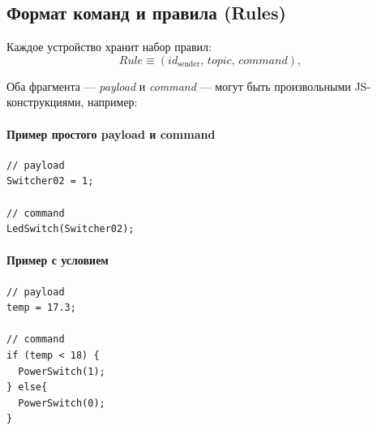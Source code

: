 \documentclass[14pt, a4paper]{extreport}
\begin{document}
\subsection{Формат команд и правила (Rules)}
Каждое устройство хранит набор правил:
\[
\textit{Rule} \equiv (\mathit{id}_{\mathrm{sender}},\,\textit{topic},\,\textit{command}),
\]

Оба фрагмента — \textit{payload} и \textit{command} — могут быть произвольными JS-конструкциями, например:

\paragraph{Пример простого payload и command}
\begin{verbatim}
// payload
Switcher02 = 1;

// command
LedSwitch(Switcher02);
\end{verbatim}

\paragraph{Пример с условием}
\begin{verbatim}
// payload
temp = 17.3;

// command
if (temp < 18) {
  PowerSwitch(1);
} else{
  PowerSwitch(0);
}
\end{verbatim}




\newpage
\end{document}

